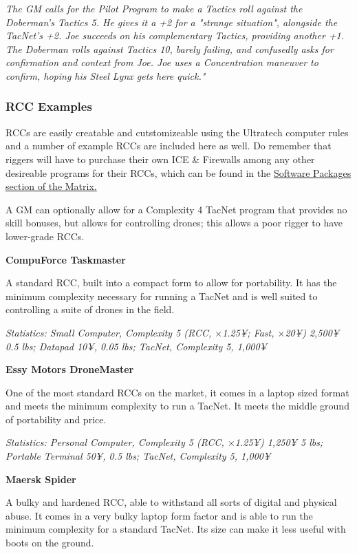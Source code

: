 \begin{multicols*}{3}
	\textcolor{OliveGreen}{\textit{The GM calls for the Pilot Program to make a Tactics roll against the Doberman's Tactics 5. He gives it a +2 for a "strange situation", alongside the TacNet's +2. Joe succeeds on his complementary Tactics, providing another +1. The Doberman rolls against Tactics 10, barely failing, and confusedly asks for confirmation and context from Joe. Joe uses a Concentration maneuver to confirm, hoping his Steel Lynx gets here quick."}}
	
	\subsubsection{RCC Examples}
	
	RCCs are easily creatable and cutstomizeable using the Ultratech computer rules and a number of example RCCs are included here as well. Do remember that riggers will have to purchase their own ICE \& Firewalls among any other desireable programs for their RCCs, which can be found in the \hyperref[software_packages]{Software Packages section of the Matrix.}
	
	A GM can optionally allow for a Complexity 4 TacNet program that provides no skill bonuses, but allows for controlling drones; this allows a poor rigger to have lower-grade RCCs.
	
	\textbf{CompuForce Taskmaster}
	
	A standard RCC, built into a compact form to allow for portability. It has the minimum complexity necessary for running a TacNet and is well suited to controlling a suite of drones in the field.
	
	\textcolor{OliveGreen}{\textit{Statistics: Small Computer, Complexity 5 (RCC, \(\times\)1.25¥; Fast, \(\times\)20¥) 2,500¥ 0.5 lbs; Datapad 10¥, 0.05 lbs; TacNet, Complexity 5, 1,000¥}}
	
	\textbf{Essy Motors DroneMaster}
	
	One of the most standard RCCs on the market, it comes in a laptop sized format and meets the minimum complexity to run a TacNet. It meets the middle ground of portability and price.
	
	\textcolor{OliveGreen}{\textit{Statistics: Personal Computer, Complexity 5 (RCC, \(\times\)1.25¥) 1,250¥ 5 lbs; Portable Terminal 50¥, 0.5 lbs; TacNet, Complexity 5, 1,000¥}}
	
	\textbf{Maersk Spider}
	
	A bulky and hardened RCC, able to withstand all sorts of digital and physical abuse. It comes in a very bulky laptop form factor and is able to run the minimum complexity for a standard TacNet. Its size can make it less useful with boots on the ground.
	

\end{multicols*}
